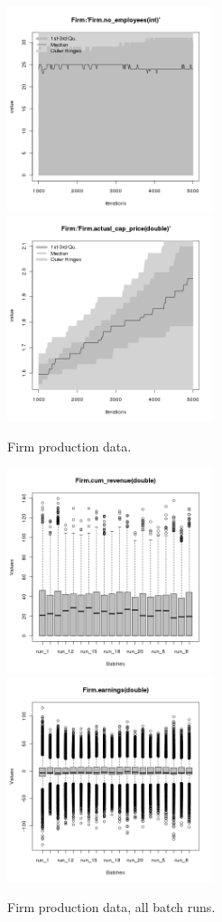 \begin{figure}[H!]
\begin{minipage}{14cm}
\includegraphics[width=6cm]{./png/tax_0.10/Firm-no_employees.png}
\includegraphics[width=6cm]{./png/tax_0.10/Firm-actual_cap_price.png}
\end{minipage}
\caption{Firm production data.}
\label{Figure: Firm Production}
\end{figure}

\begin{figure}[H!]
\centering\leavevmode
\begin{minipage}{14cm}
\centering\leavevmode
\includegraphics[width=6cm]{./png/tax_0.10/Firm-cum_revenue-batches.png}
\includegraphics[width=6cm]{./png/tax_0.10/Firm-earnings-batches.png}
\end{minipage}
\caption{Firm production data, all batch runs.}
\label{Figure: Firm Production batch}
\end{figure}
\clearpage


